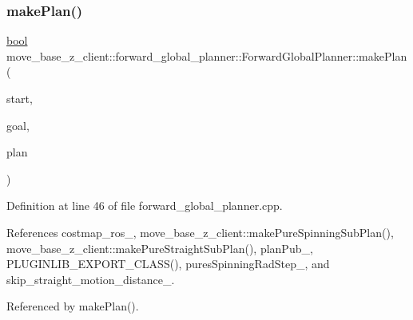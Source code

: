 \subsubsection{\texorpdfstring{make\+Plan()}{makePlan()}\hspace{0.1cm}{\footnotesize\ttfamily [1/2]}}
{\footnotesize\ttfamily \hyperlink{classbool}{bool} move\+\_\+base\+\_\+z\+\_\+client\+::forward\+\_\+global\+\_\+planner\+::\+Forward\+Global\+Planner\+::make\+Plan (\begin{DoxyParamCaption}\item[{const geometry\+\_\+msgs\+::\+Pose\+Stamped \&}]{start,  }\item[{const geometry\+\_\+msgs\+::\+Pose\+Stamped \&}]{goal,  }\item[{std\+::vector$<$ geometry\+\_\+msgs\+::\+Pose\+Stamped $>$ \&}]{plan }\end{DoxyParamCaption})}



Definition at line 46 of file forward\+\_\+global\+\_\+planner.\+cpp.



References costmap\+\_\+ros\+\_\+, move\+\_\+base\+\_\+z\+\_\+client\+::make\+Pure\+Spinning\+Sub\+Plan(), move\+\_\+base\+\_\+z\+\_\+client\+::make\+Pure\+Straight\+Sub\+Plan(), plan\+Pub\+\_\+, P\+L\+U\+G\+I\+N\+L\+I\+B\+\_\+\+E\+X\+P\+O\+R\+T\+\_\+\+C\+L\+A\+S\+S(), pures\+Spinning\+Rad\+Step\+\_\+, and skip\+\_\+straight\+\_\+motion\+\_\+distance\+\_\+.



Referenced by make\+Plan().


